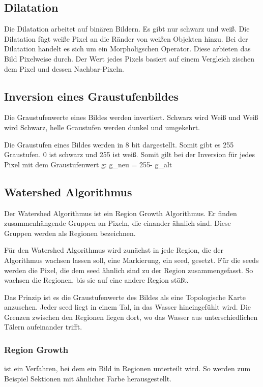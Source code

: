 \documentclass[german,a4paper, 12pt]{llncs}
\begin{document}
\subsection{Dilatation}
Die Dilatation arbeitet auf binären Bildern. Es gibt nur schwarz und weiß.
Die Dilatation fügt weiße Pixel an die Ränder von weißen Objekten hinzu. 
Bei der Dilatation handelt es sich um ein Morpholigschen Operator. Diese arbieten das Bild Pixelweise durch. Der Wert jedes Pixels basiert auf einem Vergleich zischen dem Pixel und dessen Nachbar-Pixeln.\cite{DilationCV}
	
\subsection{Inversion eines Graustufenbildes}

Die Graustufenwerte eines Bildes werden invertiert. 
Schwarz wird Weiß und Weiß wird Schwarz, helle Graustufen werden dunkel und umgekehrt.
 
Die Graustufen eines Bildes werden in 8 bit dargestellt. Somit gibt es 255 Graustufen. 0 ist schwarz und 255 ist weiß. 
Somit gilt bei der Inversion für jedes Pixel mit dem Graustufenwert g:
g_{neu} = 255- g_{alt} 

\subsection{Watershed Algorithmus}

Der Watershed Algorithmus ist ein Region Growth Algorithmus. Er finden zusammenhängende Gruppen an Pixeln, die einander ähnlich sind. Diese Gruppen werden als Regionen bezeichnen. 

Für den Watershed Algorithmus wird zunächst in jede Region, die der Algorithmus wachsen lassen soll, eine Markierung, ein seed, gesetzt.
Für die seeds werden die Pixel, die dem seed ähnlich sind zu der Region zusammengefasst. So wachsen die Regionen, bis sie auf eine andere Region stößt.

Das Prinzip ist es die Graustufenwerte des Bildes als eine Topologische Karte anzusehen. Jeder seed liegt in einem Tal, in das Wasser hineingefühlt wird. 
Die Grenzen zwischen den Regionen liegen dort, wo das Wasser aus unterschiedlichen Tälern aufeinander trifft.\cite{Watershed,WatershedCV} 

\subsubsection{Region Growth}
ist ein Verfahren, bei dem ein Bild in Regionen unterteilt wird. So werden zum Beispiel Sektionen mit ähnlicher Farbe herausgestellt.
\end{document}
